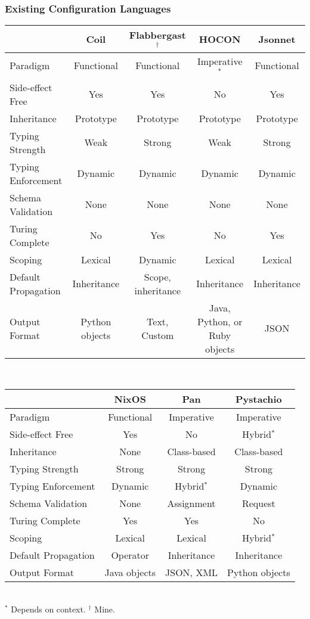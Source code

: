 \documentclass{beamer}
\begin{document}
\begin{frame}\frametitle{Existing Configuration Languages}
\tiny
\begin{tabular}{lcccc}
\hline
										& Coil						& Flabbergast$^\dagger$& HOCON					& Jsonnet		\\\hline
Paradigm						& Functional			& Functional					& Imperative$^*$&	Functional	\\
Side-effect Free		& Yes							& Yes									& No						&	Yes					\\
Inheritance					& Prototype				& Prototype						& Prototype			&	Prototype		\\
Typing Strength			& Weak						& Strong							& Weak					&	Strong			\\
Typing Enforcement	& Dynamic					& Dynamic							&	Dynamic				&	Dynamic			\\
Schema Validation		& None						& None								& None					& None				\\
Turing Complete			& No							& Yes									& No						& Yes					\\
Scoping							& Lexical					& Dynamic							& Lexical				& Lexical			\\
Default Propagation	& Inheritance			&	Scope, inheritance	& Inheritance		& Inheritance	\\
Output Format				& Python objects	&	Text, Custom				& Java, Python, or Ruby objects & JSON		\\
\hline
\end{tabular}\\
\begin{tabular}{lccc}
\hline
										& NixOS				& Pan & Pystachio \\\hline
Paradigm						& Functional	& Imperative			& Imperative \\
Side-effect Free		& Yes					& No							& Hybrid$^*$ \\
Inheritance					& None				& Class-based			& Class-based \\
Typing Strength			& Strong			& Strong					& Strong \\
Typing Enforcement	& Dynamic			& Hybrid$^*$			& Dynamic \\
Schema Validation		& None				& Assignment			& Request \\
Turing Complete			& Yes					& Yes							& No \\
Scoping							& Lexical			& Lexical					& Hybrid$^*$ \\
Default Propagation	& Operator		& Inheritance			& Inheritance \\
Output Format				& Java objects			& JSON, XML				& Python objects \\
\hline
\end{tabular}\\
$^*$ Depends on context.
$^\dagger$ Mine.
\end{frame}
\end{document}
